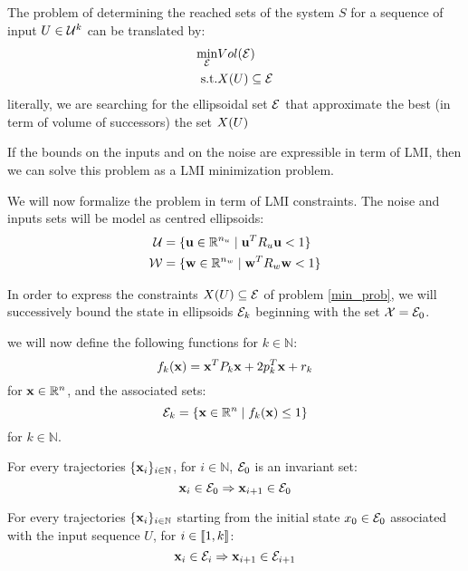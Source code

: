 The problem of determining the reached sets of the system $S$ for a sequence of input $U \in \mathcal{U}^k$ can be translated by:
\begin{equation} \label{min_prob}
\begin{aligned}
\min_{\mathcal{E}} & Vol(\mathcal{E})\\
\textrm{s.t.}   & X(U) \subseteq \mathcal{E}
\end{aligned}
\end{equation}
literally, we are searching for the ellipsoidal set $\mathcal{E}$ that approximate the best (in term of volume of successors) the set $X(U)$

If the bounds on the inputs and on the noise are expressible in term of LMI, then we can solve this problem as a LMI minimization problem.

We will now formalize the problem in term of LMI constraints.
The noise and inputs sets will be model as centred ellipsoids:
\begin{equation}
\begin{aligned}
\mathcal{U} &= \{  \mathbf{u} \in \mathbb{R}^{n_u} \mid  \mathbf{u}^T R_u  \mathbf{u} < 1 \}\\
\mathcal{W} &= \{  \mathbf{w} \in \mathbb{R}^{n_w} \mid  \mathbf{w}^T R_w  \mathbf{w} < 1 \}\\
\end{aligned}
\end{equation}

In order to express the constraints $X(U) \subseteq \mathcal{E}$ of problem \ref{min_prob}, we will successively bound the state in ellipsoids $\mathcal{E}_k$ beginning with the set $\mathcal{X} = \mathcal{E}_0$.

we will now define the following functions for $k \in \mathbb{N}$:
\begin{equation}
f_k( \mathbf{x}) =  \mathbf{x}^T P_k  \mathbf{x} + 2 p_k^T  \mathbf{x} + r_k
\end{equation}
for $ \mathbf{x} \in \mathbb{R}^n$, and the associated sets:
\begin{equation}
\mathcal{E}_k = \{  \mathbf{x} \in \mathbb{R}^n \mid f_k( \mathbf{x}) \leq 1 \}
\end{equation}
for $k\in\mathbb{N}$.

For every trajectories $\{ \mathbf{x}_i\}_{i\in \mathbb{N}}$, for $i \in \mathbb{N}$, $\mathcal{E}_0$ is an invariant set:
\begin{equation}\label{inv_ellipse}
 \mathbf{x}_i \in \mathcal{E}_0 \Rightarrow  \mathbf{x}_{i+1} \in \mathcal{E}_0
\end{equation}

For every trajectories $\{ \mathbf{x}_i\}_{i \in \mathbb{N}}$ starting from the initial state $x_0 \in \mathcal{E}_0$ associated with the input sequence $U$, for $i \in \left \llbracket 1,k \right \rrbracket$:
\begin{equation} \label{next_ellipse}
 \mathbf{x}_i \in \mathcal{E}_i \Rightarrow  \mathbf{x}_{i+1} \in \mathcal{E}_{i+1}
\end{equation}

